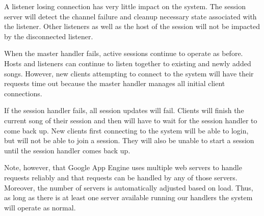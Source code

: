 A listener losing connection has very little impact on the system. The session
server will detect the channel failure and cleanup necessary state
associated with the listener. Other listeners as well as the host
of the session will not be impacted by the disconnected listener.

When the master handler fails, active sessions continue to
operate as before. Hosts and listeners can continue to listen
together to existing and newly added songs. However, new clients
attempting to connect to the system will have their requests time
out because the master handler manages all initial client connections.

If the session handler fails, all session updates will fail.
Clients will finish the current song of their session and then
will have to wait for the session handler to come back up. New clients
first connecting to the system will be able to login, but will not
be able to join a session. They will also be unable to start a session until
the session handler comes back up.

Note, however, that Google App Engine uses multiple web servers to
handle requests reliably and that requests can be handled by any of
those servers. Moreover, the number of servers is automatically 
adjusted based on load. Thus, as long as there is at least one server available
running our handlers the system will operate as normal.